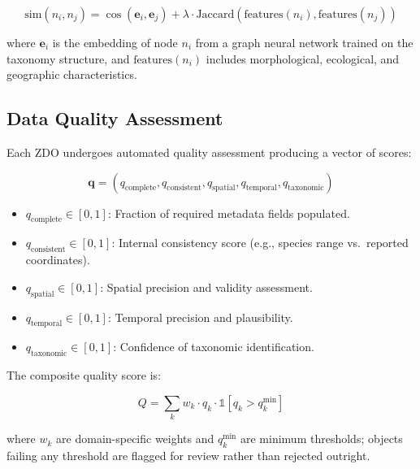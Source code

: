 \documentclass[11pt,a4paper]{article}
\begin{document}
\begin{equation}
    \text{sim}(n_i, n_j) = \cos(\mathbf{e}_i, \mathbf{e}_j) + \lambda \cdot \text{Jaccard}(\text{features}(n_i), \text{features}(n_j))
\end{equation}

\noindent where $\mathbf{e}_i$ is the embedding of node $n_i$ from a graph neural network trained on the taxonomy structure, and $\text{features}(n_i)$ includes morphological, ecological, and geographic characteristics.

\subsection{Data Quality Assessment}

Each ZDO undergoes automated quality assessment producing a vector of scores:

\begin{equation}
    \mathbf{q} = (q_{\text{complete}}, q_{\text{consistent}}, q_{\text{spatial}}, q_{\text{temporal}}, q_{\text{taxonomic}})
\end{equation}

\begin{itemize}[leftmargin=*]
    \item $q_{\text{complete}} \in [0,1]$: Fraction of required metadata fields populated.
    \item $q_{\text{consistent}} \in [0,1]$: Internal consistency score (e.g., species range vs.\ reported coordinates).
    \item $q_{\text{spatial}} \in [0,1]$: Spatial precision and validity assessment.
    \item $q_{\text{temporal}} \in [0,1]$: Temporal precision and plausibility.
    \item $q_{\text{taxonomic}} \in [0,1]$: Confidence of taxonomic identification.
\end{itemize}

The composite quality score is:

\begin{equation}
    Q = \sum_{k} w_k \cdot q_k \cdot \mathbb{1}[q_k > q_k^{\min}]
\end{equation}

\noindent where $w_k$ are domain-specific weights and $q_k^{\min}$ are minimum thresholds; objects failing any threshold are flagged for review rather than rejected outright.

\end{document}
